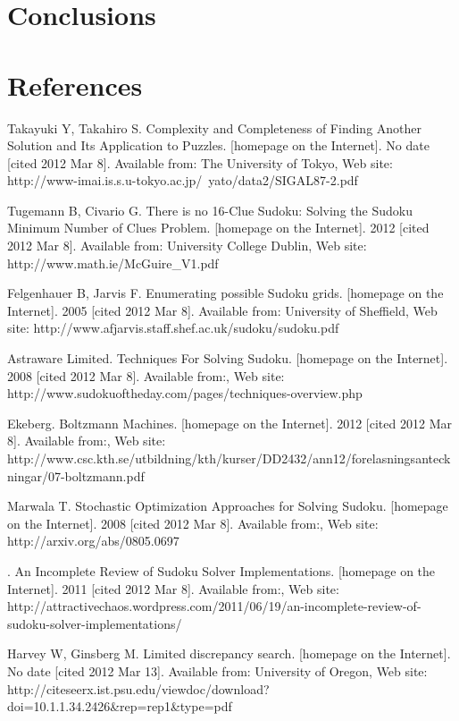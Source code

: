 \documentclass[a4paper,11pt]{kth-mag}
\begin{document}
\chapter{Conclusions}

\chapter{References}

\begin{thebibliography}{99}

Takayuki Y, Takahiro S. Complexity and Completeness of Finding Another Solution and Its Application to Puzzles. [homepage on the Internet]. No date [cited 2012 Mar 8]. Available from: The University of Tokyo, Web site: http://www-imai.is.s.u-tokyo.ac.jp/~yato/data2/SIGAL87-2.pdf

Tugemann B, Civario G. There is no 16-Clue Sudoku: Solving the Sudoku Minimum Number of Clues Problem. [homepage on the Internet]. 2012 [cited 2012 Mar 8]. Available from: University College Dublin, Web site: http://www.math.ie/McGuire\_V1.pdf

Felgenhauer B, Jarvis F. Enumerating possible Sudoku grids. [homepage on the Internet]. 2005 [cited 2012 Mar 8]. Available from: University of Sheffield, Web site: http://www.afjarvis.staff.shef.ac.uk/sudoku/sudoku.pdf

Astraware Limited. Techniques For Solving Sudoku. [homepage on the Internet]. 2008 [cited 2012 Mar 8]. Available from:, Web site: http://www.sudokuoftheday.com/pages/techniques-overview.php

Ekeberg. Boltzmann Machines. [homepage on the Internet]. 2012 [cited 2012 Mar 8]. Available from:, Web site: http://www.csc.kth.se/utbildning/kth/kurser/DD2432/ann12/forelasningsanteckningar/07-boltzmann.pdf

Marwala T. Stochastic Optimization Approaches for Solving Sudoku. [homepage on the Internet]. 2008 [cited 2012 Mar 8]. Available from:, Web site: http://arxiv.org/abs/0805.0697

. An Incomplete Review of Sudoku Solver Implementations. [homepage on the Internet]. 2011 [cited 2012 Mar 8]. Available from:, Web site: http://attractivechaos.wordpress.com/2011/06/19/an-incomplete-review-of-sudoku-solver-implementations/

Harvey W, Ginsberg M. Limited discrepancy search. [homepage on the Internet]. No date [cited 2012 Mar 13]. Available from: University of Oregon, Web site: http://citeseerx.ist.psu.edu/viewdoc/download?doi=10.1.1.34.2426\&rep=rep1\&type=pdf


\end{thebibliography}
\end{document}
